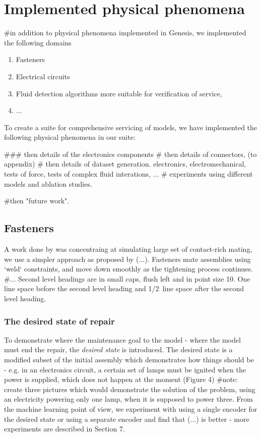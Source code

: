 \documentclass{article} %
\begin{document}
\section{Implemented physical phenomena}
\label{headings}
#in addition to physical phenomena implemented in Genesis, we implemented the following domains
\begin{enumerate}
    \item Fasteners
    \item Electrical circuits
    \item Fluid detection algorithms more suitable for verification of service,
    \item  ...
\end{enumerate}

 To create a suite for comprehensive servicing of models, we have implemented the following physical phenomena in our suite:


 ### then details of the electronics components
 # then details of connectors,  (to appendix)
 # then details of dataset generation. electronics, electromechanical, tests of force,  tests of complex fluid interations, ...
 # experiments using different models and ablation studies. 

 #then "future work".
 

\subsection{Fasteners}

A work done by \cite{Narang et al.} was concentraing at simulating large set of contact-rich mating, we use a simpler approach as proposed by (...). Fasteners mate assemblies using `weld` constraints, and move down smoothly as the tightening process continues. #...
Second level headings are in small caps,
flush left and in point size 10. One line space before the second level
heading and 1/2~line space after the second level heading.

\subsubsection{The desired state of repair}

To demonstrate where the maintenance goal to the model - where the model must end the repair, the \textit{desired state} is introduced. The desired state is a modified subset of the initial assembly which demonstrates how things should be - e.g. in an electronics circuit, a certain set of lamps must be ignited when the power is supplied, which does not happen at the moment (Figure 4) #note: create three pictures which would demonstrate the solution of the problem, using an electricity powering only one lamp, when it is supposed to power three. From the machine learning point of view, we experiment with using a single encoder for the desired state or using a separate encoder and find that (...) is better - more experiments are described in Section 7.
\end{document}
